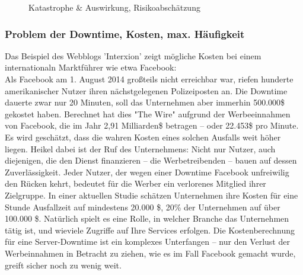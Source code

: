 \documentclass[letterpaper, 12pt]{article}
\let\tempsubsubsection\subsubsection
\renewcommand\subsubsection[1]{\vspace{0cm}\tempsubsubsection{#1}\vspace{0cm}}
\begin{document}
\begin{figure}[h]
\caption{Katastrophe \& Auswirkung, Risikoabschätzung} 
\end{figure} 
\newpage

\subsubsection{Problem der Downtime, Kosten, max. Häufigkeit}

Das Beispiel des Webblogs 'Interxion' zeigt mögliche Kosten bei einem internationaln Marktführer wie etwa Facebook: \\
Als Facebook am 1. August 2014 großteils nicht erreichbar war, riefen hunderte amerikanischer Nutzer ihren nächstgelegenen Polizeiposten an. Die Downtime dauerte zwar nur 20 Minuten, soll das Unternehmen aber immerhin 500.000\$ gekostet haben. Berechnet hat dies "The Wire" aufgrund der Werbeeinnahmen von Facebook, die im Jahr 2,91 Milliarden\$ betragen – oder 22.453\$ pro Minute. Es wird geschätzt, dass die wahren Kosten eines solchen Ausfalls weit höher liegen. Heikel dabei ist der Ruf des Unternehmens: Nicht nur Nutzer, auch diejenigen, die den Dienst finanzieren – die Werbetreibenden – bauen auf dessen Zuverlässigkeit. Jeder Nutzer, der wegen einer Downtime Facebook unfreiwilig den Rücken kehrt, bedeutet für die Werber ein verlorenes Mitglied ihrer Zielgruppe. In einer aktuellen Studie schätzen Unternehmen ihre Kosten für eine Stunde Ausfallzeit auf mindestens 20.000 \$, 20\% der Unternehmen auf über 100.000 \$. Natürlich spielt es eine Rolle, in welcher Branche das Unternehmen tätig ist, und wieviele Zugriffe auf Ihre Services erfolgen. Die Kostenberechnung für eine Server-Downtime ist ein komplexes Unterfangen –  nur den Verlust der Werbeinnahmen in Betracht zu ziehen, wie es im Fall Facebook gemacht wurde, greift sicher noch zu wenig weit.
\end{document}
